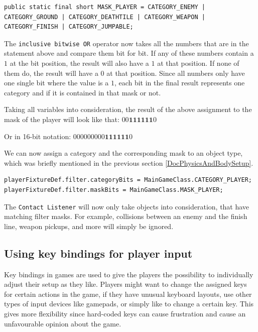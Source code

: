 \documentclass[12p]{article}
\begin{document}
\begin{verbatim}
public static final short MASK_PLAYER = CATEGORY_ENEMY | CATEGORY_GROUND | CATEGORY_DEATHTILE | CATEGORY_WEAPON | CATEGORY_FINISH | CATEGORY_JUMPABLE;
\end{verbatim}

The \texttt{inclusive bitwise OR} operator now takes all the numbers that are in the statement above and compare them bit for bit. If any of these numbers contain a $1$ at the bit position, the result will also have a $1$ at that position. If none of them do, the result will have a $0$ at that position. Since all numbers only have one single bit where the value is a $1$, each bit in the final result represents one category and if it is contained in that mask or not.

Taking all variables into consideration, the result of the above assignment to the mask of the player will look like that: $00\mathbf{111111}0$

Or in 16-bit notation: $000000000\mathbf{111111}0$

We can now assign a category and the corresponding mask to an object type, which was briefly mentioned in the previous section \ref{DocPhysicsAndBodySetup}.

\begin{verbatim}
playerFixtureDef.filter.categoryBits = MainGameClass.CATEGORY_PLAYER;
playerFixtureDef.filter.maskBits = MainGameClass.MASK_PLAYER;
\end{verbatim}

The \texttt{Contact Listener} will now only take objects into consideration, that have matching filter masks. For example, collisions between an enemy and the finish line, weapon pickups, and more will simply be ignored.


\subsection{Using key bindings for player input} \label{DocKeyBindings}

Key bindings in games are used to give the players the possibility to individually adjust their setup as they like. Players might want to change the assigned keys for certain actions in the game, if they have unusual keyboard layouts, use other types of input devices like gamepads, or simply like to change a certain key. This gives more flexibility since hard-coded keys can cause frustration and cause an unfavourable opinion about the game.
\end{document}
